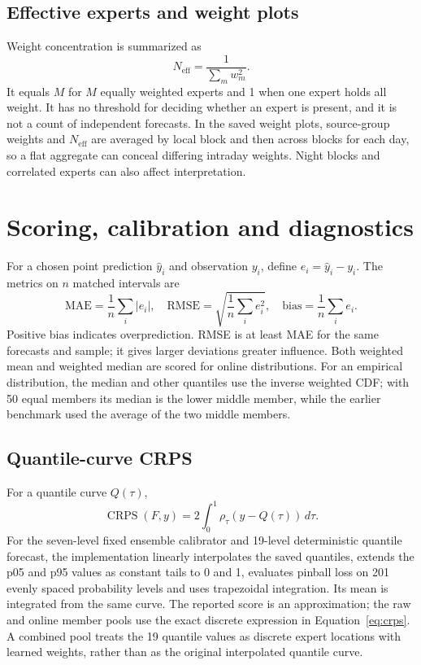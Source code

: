 \documentclass[11pt,a4paper]{article}
\begin{document}
\subsection{Effective experts and weight plots}
Weight concentration is summarized as
\begin{equation} N_{\mathrm{eff}}=\frac{1}{\sum_mw_m^2}.\end{equation}
It equals $M$ for $M$ equally weighted experts and 1 when one expert holds all weight. It has no threshold for deciding whether an expert is present, and it is not a count of independent forecasts. In the saved weight plots, source-group weights and $N_{\mathrm{eff}}$ are averaged by local block and then across blocks for each day, so a flat aggregate can conceal differing intraday weights. Night blocks and correlated experts can also affect interpretation.

\section{Scoring, calibration and diagnostics}\label{sec:metrics}
For a chosen point prediction $\hat y_i$ and observation $y_i$, define $e_i=\hat y_i-y_i$. The metrics on $n$ matched intervals are
\begin{equation}
 \mathrm{MAE}=\frac1n\sum_i|e_i|,\quad
 \mathrm{RMSE}=\sqrt{\frac1n\sum_i e_i^2},\quad
 \mathrm{bias}=\frac1n\sum_i e_i.
\end{equation}
Positive bias indicates overprediction. RMSE is at least MAE for the same forecasts and sample; it gives larger deviations greater influence. Both weighted mean and weighted median are scored for online distributions. For an empirical distribution, the median and other quantiles use the inverse weighted CDF; with 50 equal members its median is the lower middle member, while the earlier benchmark used the average of the two middle members.

\subsection{Quantile-curve CRPS}
For a quantile curve $Q(\tau)$,
\begin{equation}\operatorname{CRPS}(F,y)=2\int_0^1\rho_\tau\!\left(y-Q(\tau)\right)\,d\tau.\end{equation}
For the seven-level fixed ensemble calibrator and 19-level deterministic quantile forecast, the implementation linearly interpolates the saved quantiles, extends the p05 and p95 values as constant tails to 0 and 1, evaluates pinball loss on 201 evenly spaced probability levels and uses trapezoidal integration. Its mean is integrated from the same curve. The reported score is an approximation; the raw and online member pools use the exact discrete expression in Equation~\eqref{eq:crps}. A combined pool treats the 19 quantile values as discrete expert locations with learned weights, rather than as the original interpolated quantile curve.
\end{document}

